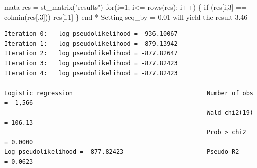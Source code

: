 \documentclass[
  10pt,
  a4paper,
]{book}
\newenvironment{Shaded}{\begin{snugshade}}{\end{snugshade}}
\newcommand{\BaseNTok}[1]{\textcolor[rgb]{0.68,0.00,0.00}{#1}}
\newcommand{\KeywordTok}[1]{\textcolor[rgb]{0.00,0.46,0.62}{#1}}
\newcommand{\NormalTok}[1]{\textcolor[rgb]{0.00,0.46,0.62}{#1}}
\newcommand{\StringTok}[1]{\textcolor[rgb]{0.13,0.47,0.30}{#1}}
\begin{document}
\begin{Shaded}
\begin{Highlighting}[]
\KeywordTok{mata}
\NormalTok{res = st\_matrix(}\StringTok{"results"}\NormalTok{)}
\KeywordTok{for}\NormalTok{(i=1; i\textless{}= }\BaseNTok{rows}\NormalTok{(res); i++) \{ }
  \KeywordTok{if}\NormalTok{ (res[i,3] == }\KeywordTok{colmin}\NormalTok{(res[,3])) res[i,1]}
\NormalTok{\}}
\KeywordTok{end}
\NormalTok{* Setting seq\_by = 0.01 will yield the result 3.46}
\end{Highlighting}
\end{Shaded}

\begin{verbatim}
Iteration 0:   log pseudolikelihood = -936.10067  
Iteration 1:   log pseudolikelihood = -879.13942  
Iteration 2:   log pseudolikelihood = -877.82647  
Iteration 3:   log pseudolikelihood = -877.82423  
Iteration 4:   log pseudolikelihood = -877.82423  

Logistic regression                                     Number of obs =  1,566
                                                        Wald chi2(19) = 106.13
                                                        Prob > chi2   = 0.0000
Log pseudolikelihood = -877.82423                       Pseudo R2     = 0.0623


\end{verbatim}
\end{document}
